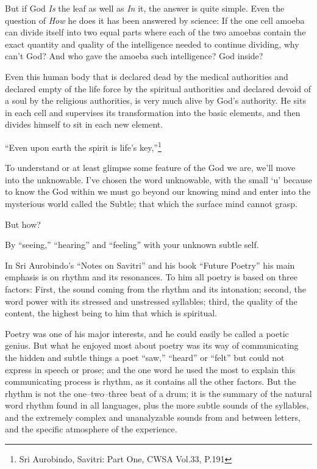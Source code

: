 \documentclass[12pt,a4paper]{book}
\begin{document}
But if God \emph{Is} the leaf as well as \emph{In} it, the answer is
quite simple. Even the question of \emph{How} he does it has been
answered by science: If the one cell amoeba can divide itself into two
equal parts where each of the two amoebas contain the exact quantity
and quality of the intelligence needed to continue dividing, why can't
God? And who gave the amoeba such intelligence? God inside?

Even this human body that is declared dead by the medical authorities
and declared empty of the life force by the spiritual authorities and
declared devoid of a soul by the religious authorities, is very much
alive by God's authority. He sits in each cell and supervises its
transformation into the basic elements, and then divides himself to
sit in each new element.

``Even upon earth the spirit is life's key,''\footnote{Sri Aurobindo,
  Savitri: Part One, CWSA Vol.33, P.191}

To understand or at least glimpse some feature of the God we are,
we'll move into the unknowable. I've chosen the word unknowable,
with the small `u' because to know the God within we must go beyond
our knowing mind and enter into the mysterious world called the
Subtle; that which the surface mind cannot grasp.

\noindent But how?

\noindent By ``seeing,'' ``hearing'' and ``feeling'' with your unknown
subtle self.

In Sri Aurobindo's ``Notes on Savitri'' and his book ``Future Poetry''
his main emphasis is on rhythm and its resonances. To him all poetry
is based on three factors: First, the sound coming from the rhythm and
its intonation; second, the word power with its stressed and
unstressed syllables; third, the quality of the content, the highest
being to him that which is spiritual.

Poetry was one of his major interests, and he could easily be called a
poetic genius. But what he enjoyed most about poetry was its way of
communicating the hidden and subtle things a poet ``saw,'' ``heard''
or ``felt'' but could not express in speech or prose; and the one word
he used the most to explain this communicating process is rhythm, as
it contains all the other factors. But the rhythm is not the
one--two--three beat of a drum; it is the summary of the natural word
rhythm found in all languages, plus the more subtle sounds of the
syllables, and the extremely complex and unanalyzable sounds from and
between letters, and the specific atmosphere of the experience.
\end{document}
